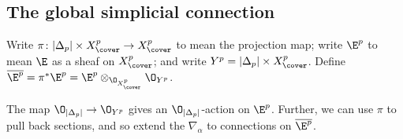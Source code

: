     \subsection{The global simplicial connection} %
    \label{sub:the_global_simplicial_connection}
            
        Write $\pi\colon |\Delta_p|\times X^p_\cover\to X^p_\cover$ to mean the projection map; write $\E^p$ to mean $\E$ as a sheaf on $X^p_\cover$; and write $Y^p=|\Delta_p|\times X^p_\cover$.
        Define $\overline{\E^p} = \pi^*\E^p = \E^p\otimes_{\O_{X^p_\cover}}\O_{Y^p}$.

        \begin{note}\label{note:how-does-ti-act-on-e}
            The map $\O_{|\Delta_p|}\to\O_{Y^p}$ gives an $\O_{|\Delta_p|}$-action on $\E^p$.
            Further, we can use $\pi$ to pull back sections, and so extend the $\nabla_\alpha$ to connections on $\overline{\E^p}$.           
        \end{note}


